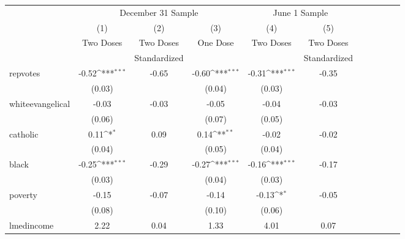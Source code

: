 \begin{minipage}{6.5in}
	\centering
	\def\sym#1{\ifmmode^{#1}\else\(^{#1}\)\fi}
	\def\arraystretch{1.1}
	\begin{tabular*}{\textwidth}{@{\extracolsep{\fill}}l*{5}{cc}}
	\hline\hline
				&\multicolumn{3}{c}{December 31 Sample}     & \multicolumn{2}{c}{June 1 Sample}\\
				\cmidrule{2-4}\cmidrule(l{1ex}r{1ex}){5-6}
	            &\multicolumn{1}{c}{(1)}         &\multicolumn{1}{c}{(2)}&\multicolumn{1}{c}{(3)}         &\multicolumn{1}{c}{(4)}         &\multicolumn{1}{c}{(5)}\\
	            &        \multirow{2}{*}{Two Doses}        &    Two Doses    &       \multirow{2}{*}{One Dose}         &        \multirow{2}{*}{Two Doses}         &        Two Doses\\
	            &&Standardized&&&Standardized\\ 
	\hline
	\multirow{2}{*}{repvotes}&       -0.52\sym{***}&       -0.65&       -0.60\sym{***}&       -0.31\sym{***}&       -0.35\\
	            &      (0.03)         &            &      (0.04)         &      (0.03)         &            \\
	\multirow{2}{*}{whiteevangelical}&       -0.03         &       -0.03&       -0.05         &       -0.04         &       -0.03\\
	            &      (0.06)         &            &      (0.07)         &      (0.05)         &            \\
	\multirow{2}{*}{catholic}    &        0.11\sym{*}  &        0.09&        0.14\sym{**} &       -0.02         &       -0.02\\
	            &      (0.04)         &            &      (0.05)         &      (0.04)         &            \\
	\multirow{2}{*}{black}       &       -0.25\sym{***}&       -0.29&       -0.27\sym{***}&       -0.16\sym{***}&       -0.17\\
	            &      (0.03)         &            &      (0.04)         &      (0.03)         &            \\
	\multirow{2}{*}{poverty}     &       -0.15         &       -0.07&       -0.14         &       -0.13\sym{*}  &       -0.05\\
	            &      (0.08)         &            &      (0.10)         &      (0.06)         &            \\
	\multirow{2}{*}{lmedincome}  &        2.22         &        0.04&        1.33         &        4.01         &        0.07\\

\end{tabular*}
\end{minipage}
